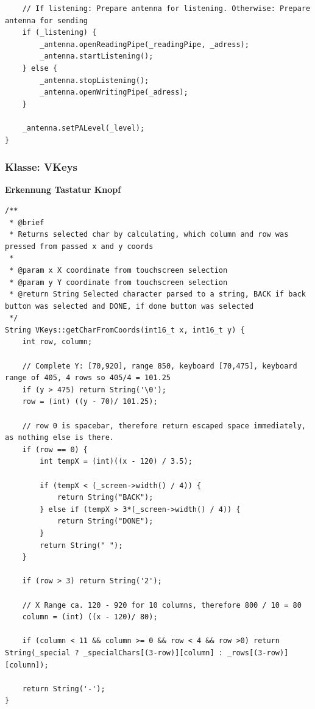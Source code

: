 \documentclass[a4paper, 11pt]{scrartcl}
\begin{document}
\begin{small}
\begin{lstlisting}
    // If listening: Prepare antenna for listening. Otherwise: Prepare antenna for sending
    if (_listening) {
        _antenna.openReadingPipe(_readingPipe, _adress);
        _antenna.startListening();
    } else {
        _antenna.stopListening();
        _antenna.openWritingPipe(_adress);
    }

    _antenna.setPALevel(_level);
}
\end{lstlisting}

\subsubsection{Klasse: VKeys}
\begin{flushleft}
    \textbf{Erkennung Tastatur Knopf}\label{code:keys}
\end{flushleft}
\begin{lstlisting}
/**
 * @brief 
 * Returns selected char by calculating, which column and row was pressed from passed x and y coords
 * 
 * @param x X coordinate from touchscreen selection
 * @param y Y coordinate from touchscreen selection
 * @return String Selected character parsed to a string, BACK if back button was selected and DONE, if done button was selected
 */
String VKeys::getCharFromCoords(int16_t x, int16_t y) {
    int row, column;

    // Complete Y: [70,920], range 850, keyboard [70,475], keyboard range of 405, 4 rows so 405/4 = 101.25
    if (y > 475) return String('\0');
    row = (int) ((y - 70)/ 101.25);

    // row 0 is spacebar, therefore return escaped space immediately, as nothing else is there.
    if (row == 0) {
        int tempX = (int)((x - 120) / 3.5);

        if (tempX < (_screen->width() / 4)) {
            return String("BACK");
        } else if (tempX > 3*(_screen->width() / 4)) {
            return String("DONE");
        }
        return String(" ");
    }

    if (row > 3) return String('2');

    // X Range ca. 120 - 920 for 10 columns, therefore 800 / 10 = 80
    column = (int) ((x - 120)/ 80);

    if (column < 11 && column >= 0 && row < 4 && row >0) return String(_special ? _specialChars[(3-row)][column] : _rows[(3-row)][column]);
    
    return String('-');
}
\end{lstlisting}


\end{small}
\end{document}
